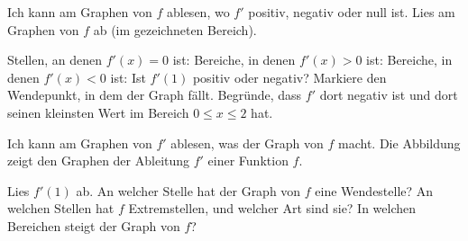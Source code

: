 \setcounter{aufgabe}{28}

\begin{aufgabe}{Ich kann am Graphen von $f$ ablesen, wo $f'$ positiv, negativ oder null ist.}
Lies am Graphen von $f$ ab (im gezeichneten Bereich).

\begin{ksys}[xmin=-3,xmax=3,ymin=-4,ymax=4,ablesen]
\end{ksys}

\begin{teile}
\teil Stellen, an denen $f'(x) = 0$ ist: \leerfeld
\teil Bereiche, in denen $f'(x) > 0$ ist: \leerfeld
\teil Bereiche, in denen $f'(x) < 0$ ist: \leerfeld
\teil Ist $f'(1)$ positiv oder negativ? \leerfeld
{}
\teil Markiere den Wendepunkt, in dem der Graph fällt. Begründe, dass $f'$ dort negativ ist und dort seinen kleinsten Wert im Bereich $0 \le x \le 2$ hat.
\end{teile}
\end{aufgabe}

\begin{aufgabe}{Ich kann am Graphen von $f'$ ablesen, was der Graph von $f$ macht.}
Die Abbildung zeigt den Graphen der Ableitung $f'$ einer Funktion $f$.

\begin{ksys}[xmin=-2,xmax=4,ymin=-3,ymax=3,ablesen]
\end{ksys}

\begin{teile}
\teil Lies $f'(1)$ ab. \leerfeld
\teil An welcher Stelle hat der Graph von $f$ eine Wendestelle? \leerfeld
{}
\teil An welchen Stellen hat $f$ Extremstellen, und welcher Art sind sie?
\teil In welchen Bereichen steigt der Graph von $f$?
\end{teile}
\end{aufgabe}

